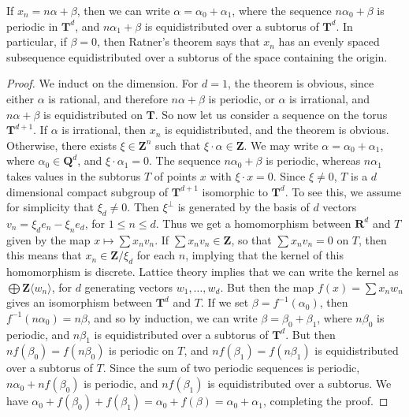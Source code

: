 \begin{theorem}[Ratner]
    If $x_n = n \alpha + \beta$, then we can write $\alpha = \alpha_0 + \alpha_1$, where the sequence $n \alpha_0 + \beta$ is periodic in $\mathbf{T}^d$, and $n \alpha_1 + \beta$ is equidistributed over a subtorus of $\mathbf{T}^d$. In particular, if $\beta = 0$, then Ratner's theorem says that $x_n$ has an evenly spaced subsequence equidistributed over a subtorus of the space containing the origin.
\end{theorem}
\begin{proof}
    We induct on the dimension. For $d = 1$, the theorem is obvious, since either $\alpha$ is rational, and therefore $n \alpha + \beta$ is periodic, or $\alpha$ is irrational, and $n \alpha + \beta$ is equidistributed on $\mathbf{T}$. So now let us consider a sequence on the torus $\mathbf{T}^{d+1}$. If $\alpha$ is irrational, then $x_n$ is equidistributed, and the theorem is obvious. Otherwise, there exists $\xi \in \mathbf{Z}^n$ such that $\xi \cdot \alpha \in \mathbf{Z}$. We may write $\alpha = \alpha_0 + \alpha_1$, where $\alpha_0 \in \mathbf{Q}^d$, and $\xi \cdot \alpha_1 = 0$. The sequence $n\alpha_0 + \beta$ is periodic, whereas $n \alpha_1$ takes values in the subtorus $T$ of points $x$ with $\xi \cdot x = 0$. Since $\xi \neq 0$, $T$ is a $d$ dimensional compact subgroup of $\mathbf{T}^{d+1}$ isomorphic to $\mathbf{T}^d$. To see this, we assume for simplicity that $\xi_d \neq 0$. Then $\xi^\perp$ is generated by the basis of $d$ vectors $v_n = \xi_d e_n - \xi_n e_d$, for $1 \leq n \leq d$. Thus we get a homomorphism between $\mathbf{R}^d$ and $T$ given by the map $x \mapsto \sum x_n v_n$. If $\sum x_n v_n \in \mathbf{Z}$, so that $\sum x_n v_n = 0$ on $T$, then this means that $x_n \in \mathbf{Z}/\xi_d$ for each $n$, implying that the kernel of this homomorphism is discrete. Lattice theory implies that we can write the kernel as $\bigoplus \mathbf{Z} \langle w_n \rangle$, for $d$ generating vectors $w_1, \dots, w_d$. But then the map $f(x) = \sum x_n w_n$ gives an isomorphism between $\mathbf{T}^d$ and $T$. If we set $\beta = f^{-1}(\alpha_0)$, then $f^{-1}(n\alpha_0) = n \beta$, and so by induction, we can write $\beta = \beta_0 + \beta_1$, where $n\beta_0$ is periodic, and $n \beta_1$ is equidistributed over a subtorus of $\mathbf{T}^d$. But then $n f(\beta_0) = f(n \beta_0)$ is periodic on $T$, and $n f(\beta_1) = f(n \beta_1)$ is equidistributed over a subtorus of $T$. Since the sum of two periodic sequences is periodic, $n \alpha_0 + n f(\beta_0)$ is periodic, and $n f(\beta_1)$ is equidistributed over a subtorus. We have $\alpha_0 + f(\beta_0) + f(\beta_1) = \alpha_0 + f(\beta) = \alpha_0 + \alpha_1$, completing the proof.
\end{proof}

